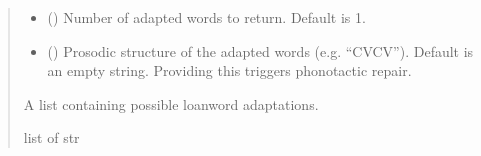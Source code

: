 \documentclass[letterpaper,10pt,english]{sphinxmanual}
\begin{document}
\begin{fulllineitems}
\begin{fulllineitems}
\begin{quote}
\begin{description}
\begin{itemize}
\item {} 
\sphinxAtStartPar
{} () \textendash{} Number of adapted words to return. Default is 1.

\item {} 
\sphinxAtStartPar
{} () \textendash{} Prosodic structure of the adapted words (e.g. “CVCV”).
Default is an empty string. Providing this triggers
phonotactic repair.

\end{itemize}

\sphinxAtStartPar
A list containing possible loanword adaptations.

\sphinxAtStartPar
list of str

\end{description}\end{quote}

\sphinxAtStartPar
{}


\end{fulllineitems}
\end{fulllineitems}
\end{document}
